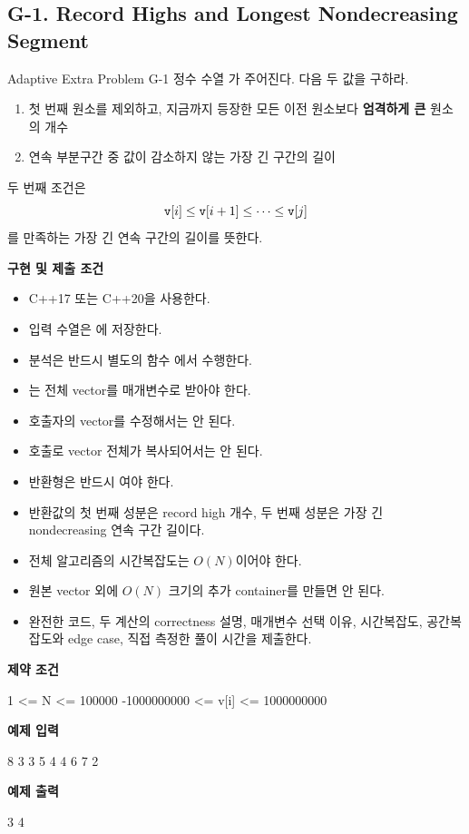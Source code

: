 \subsection{G-1. Record Highs and Longest Nondecreasing Segment}
\begin{problembox}{Adaptive Extra Problem G-1}
정수 수열 가 주어진다. 다음 두 값을 구하라.
\begin{enumerate}
  \item 첫 번째 원소를 제외하고, 지금까지 등장한 모든 이전 원소보다 \textbf{엄격하게 큰} 원소의 개수
  \item 연속 부분구간 중 값이 감소하지 않는 가장 긴 구간의 길이
\end{enumerate}
두 번째 조건은
\[
\texttt{v}[i] \le \texttt{v}[i+1] \le \cdots \le \texttt{v}[j]
\]
를 만족하는 가장 긴 연속 구간의 길이를 뜻한다.

\textbf{구현 및 제출 조건}
\begin{itemize}
  \item C++17 또는 C++20을 사용한다.
  \item 입력 수열은 에 저장한다.
  \item 분석은 반드시 별도의 함수 에서 수행한다.
  \item {}는 전체 vector를 매개변수로 받아야 한다.
  \item 호출자의 vector를 수정해서는 안 된다.
  \item 호출로 vector 전체가 복사되어서는 안 된다.
  \item 반환형은 반드시 여야 한다.
  \item 반환값의 첫 번째 성분은 record high 개수, 두 번째 성분은 가장 긴 nondecreasing 연속 구간 길이다.
  \item 전체 알고리즘의 시간복잡도는 $O(N)$이어야 한다.
  \item 원본 vector 외에 $O(N)$ 크기의 추가 container를 만들면 안 된다.
  \item 완전한 코드, 두 계산의 correctness 설명, 매개변수 선택 이유, 시간복잡도, 공간복잡도와 edge case, 직접 측정한 풀이 시간을 제출한다.
\end{itemize}

\textbf{제약 조건}
\begin{TextBlock}
1 <= N <= 100000
-1000000000 <= v[i] <= 1000000000
\end{TextBlock}

\textbf{예제 입력}
\begin{TextBlock}
8
3 3 5 4 4 6 7 2
\end{TextBlock}

\textbf{예제 출력}
\begin{TextBlock}
3 4
\end{TextBlock}
\end{problembox}

